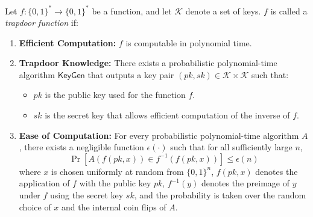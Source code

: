 \documentclass{iacrtrans}
\begin{document}
\begin{definition}
	Let $f: \{0,1\}^* \to \{0,1\}^*$ be a function, and let $\mathcal{K}$ denote a set of keys. $f$ is called a \textit{trapdoor function} if:
	\begin{enumerate}
		\item \textbf{Efficient Computation:} $f$ is computable in polynomial time.
		\item \textbf{Trapdoor Knowledge:} There exists a probabilistic polynomial-time algorithm $\mathsf{KeyGen}$ that outputs a key pair $(pk, sk) \in \mathcal{K} \times \mathcal{K}$ such that:
		      \begin{itemize}
		      	\item $pk$ is the public key used for the function $f$.
		      	\item $sk$ is the secret key that allows efficient computation of the inverse of $f$.
		      \end{itemize}
		\item \textbf{Ease of Computation:} For every probabilistic polynomial-time algorithm $A$, there exists a negligible function $\epsilon(\cdot)$ such that for all sufficiently large $n$,
		      \[
		      	\Pr[A(f(pk, x)) \in f^{-1}(f(pk, x))] \leq \epsilon(n)
		      \]
		      where $x$ is chosen uniformly at random from $\{0,1\}^n$, $f(pk, x)$ denotes the application of $f$ with the public key $pk$, $f^{-1}(y)$ denotes the preimage of $y$ under $f$ using the secret key $sk$, and the probability is taken over the random choice of $x$ and the internal coin flips of $A$.
	\end{enumerate}
\end{definition}
\end{document}
